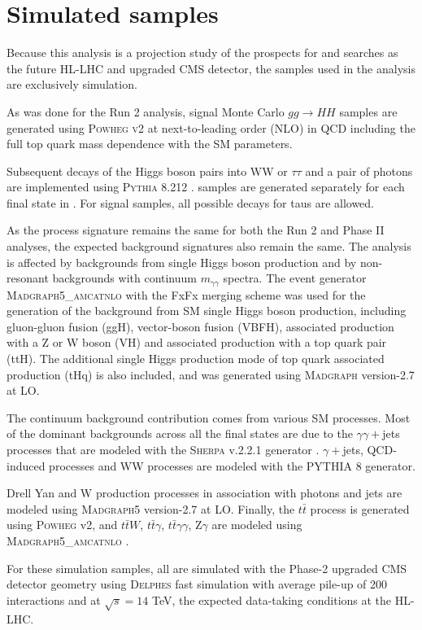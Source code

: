 \section{Simulated samples} \label{sec:Phase_II_Samples}

Because this analysis is a projection study of the prospects for \wwgg and \ttgg searches as the future HL-LHC and upgraded CMS detector, the samples used in the analysis are exclusively simulation. 

As was done for the Run 2 analysis, signal Monte Carlo $gg\rightarrow HH$ samples are generated using \textsc{Powheg v2} \cite{Nason:2004rx, Frixione:2007vw, Alioli:2010xd, Heinrich:2019bkc} 
at next-to-leading order (NLO) in QCD including the full top quark mass dependence with the SM parameters. 

Subsequent decays of the Higgs boson pairs into WW or $\tau\tau$ and a pair of photons are implemented using \textsc{Pythia 8.212} \cite{Sjostrand:2014zea}. \wwgg samples are generated separately for each final state in \wwgg. 
For \ttgg signal samples, all possible decays for taus are allowed.

As the process signature remains the same for both the Run 2 and Phase II analyses, the expected background signatures also remain the same. The analysis is affected by backgrounds from single Higgs boson production and by non-resonant backgrounds with continuum $m_{\gamma\gamma}$ spectra.
The event generator \textsc{Madgraph5\_amcatnlo} \cite{Alwall:2014hca, Artoisenet:2012st} with the FxFx merging scheme \cite{Frederix:2012ps} was used for the generation of the background from SM single Higgs boson production, including  gluon-gluon fusion (ggH), vector-boson fusion (VBFH), associated production with a Z or W boson (VH)  and associated production with a top quark pair (ttH). The additional single Higgs production mode of top quark associated production (tHq) is also included, and was generated using \textsc{Madgraph} version-2.7 at LO. 

The continuum background contribution comes from various SM processes. Most of the dominant backgrounds
across all the final states are due to the $\gamma\gamma+$jets processes that are 
modeled with the \textsc{Sherpa} v.2.2.1 generator \cite{Bothmann:2019yzt}.
$\gamma+$jets, QCD-induced processes and WW processes are modeled with the PYTHIA 8 \cite{Sjostrand:2014zea} generator.

Drell Yan and W production processes in association with photons and jets are modeled using \textsc{Madgraph5} version-2.7 at LO. 
Finally, the $t\bar{t}$ process is generated using \textsc{Powheg} v2, and $t\bar{t}W$, $t\bar{t}\gamma$, $t\bar{t}\gamma\gamma$, Z$\gamma$ are modeled using \textsc{Madgraph5\_amcatnlo} \cite{Alwall:2014hca,Artoisenet:2012st,Frederix:2012ps}.

For these simulation samples, all are simulated with the Phase-2 upgraded CMS detector geometry using \textsc{Delphes} fast simulation  
with average pile-up of 200 interactions and at 
$\sqrt{s}=14$ TeV, the expected data-taking conditions at the HL-LHC. 